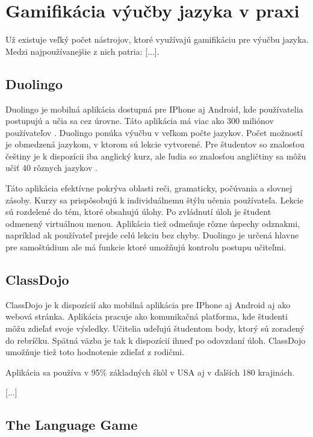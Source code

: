 \documentclass[10pt,twoside,slovak,a4paper]{article}
\begin{document}
\section{Gamifikácia výučby jazyka v praxi} \label{prax}

Už existuje veľký počet nástrojov, ktoré využívajú gamifikáciu pre výučbu jazyka. Medzi najpoužívanejšie z nich patria: [...]. \cite{Prathyusha}

\subsection{Duolingo}

Duolingo je mobilná aplikácia dostupná pre IPhone aj Android, kde používatelia postupujú a učia sa cez úrovne. Táto aplikácia má viac ako 300 miliónov používateľov \cite{Frederic}. Duolingo ponúka výučbu v veľkom počte jazykov. Počet možností je obmedzená jazykom, v ktorom sú lekcie vytvorené. Pre študentov so znalosťou češtiny je k dispozícii iba anglický kurz, ale ľudia so znalosťou angličtiny sa môžu učiť 40 rôznych jazykov \cite{Duolingo}.

Táto aplikácia efektívne pokrýva oblasti reči, gramaticky, počúvania a slovnej zásoby. Kurzy sa prispôsobujú k individuálnemu štýlu učenia používateľa. Lekcie sú rozdelené do tém, ktoré obsahujú úlohy. Po zvládnutí úloh je študent odmenený virtuálnou menou. Aplikácia tiež odmeňuje rôzne úspechy odznakmi, napríklad ak používateľ prejde celú lekciu bez chyby. Duolingo je určená hlavne pre samoštúdium ale má funkcie ktoré umožňujú kontrolu postupu učiteľmi. \cite{Prathyusha}

\subsection{ClassDojo}

ClassDojo je k dispozícií ako mobilná aplikácia pre IPhone aj Android aj ako webová stránka. Aplikácia pracuje ako komunikačná platforma, kde študenti môžu zdieľať svoje výsledky. Učitelia udeľujú študentom body, ktorý sú zoradený do rebríčku. Spätná väzba je tak k dispozícií ihneď po odovzdaní úloh. ClassDojo umožňuje tiež toto hodnotenie zdieľať z rodičmi. \cite{Prathyusha}

Aplikácia sa používa v 95\% základných škôl v USA aj v ďalších 180 krajinách. \cite{Chaykowski}

[...]

\subsection{The Language Game}
\end{document}
